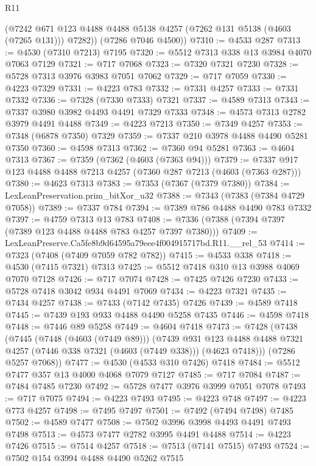 \begin{lexlean}{R11}
\begin{coremodule}
        (@7242 @671 @123 @4488 @4488 @5138 @4257 (@7262 @131 @5138 (@4603 (@7265 @131))) @7282))
      (@7286 @7046 @4500))
@7310 := @4533 @287
@7313 := @4530 (@7310 @7213) @7195
@7320 := @5512 @7313 @338 @13 @3984 @4070 @7063 @7129
@7321 := @717 @7068
@7323 := @7320 @7321 @7230
@7328 := @5728 @7313 @3976 @3983 @7051 @7062
@7329 := @717 @7059
@7330 := @4223 @7329
@7331 := @4223 @783
@7332 := @7331 @4257
@7333 := @7331 @7332
@7336 := @7328 (@7330 @7333) @7321
@7337 := @4589 @7313
@7343 := @7337 @3980 @3982 @4493 @4491 @7329 @7333
@7348 := @4573 @7313 @2782 @3979 @4491 @4488
@7349 := @4223 @7213
@7350 := @7349 @4257
@7353 := @7348 (@6878 @7350) @7329
@7359 := @7337 @210 @3978 @4488 @4490 @5281 @7350
@7360 := @4598 @7313
@7362 := @7360 @94 @5281
@7363 := @4604 @7313
@7367 := @7359 (@7362 (@4603 (@7363 @94)))
@7379 := @7337 @917 @123 @4488 @4488 @7213 @4257 (@7360 @287 @7213 (@4603 (@7363 @287)))
@7380 := @4623 @7313
@7383 := @7353 (@7367 (@7379 @7380))
@7384 := LexLeanPreservation.prim_bitXor_u32
@7388 := @7343 (@7383 (@7384 @4729 @7058))
@7389 := @7337 @784
@7394 := @7389 @786 @4488 @4490 @783 @7332
@7397 := @4759 @7313 @13 @783
@7408 := @7336 (@7388 (@7394 @7397 (@7389 @123 @4488 @4488 @783 @4257 @7397 @7380)))
@7409 := LexLeanPreserve.Ca5fe8b9d64595a79eee4f004915717bd.R11.__rel_53
@7414 := @7323 (@7408 (@7409 @7059 @782 @782))
@7415 := @4533 @338
@7418 := @4530 (@7415 @7321) @7313
@7425 := @5512 @7418 @310 @13 @3988 @4069 @7070 @7128
@7426 := @717 @7074
@7428 := @7425 @7426 @7230
@7433 := @5728 @7418 @3042 @934 @4491 @7069
@7434 := @4223 @7321
@7435 := @7434 @4257
@7438 := @7433 (@7142 @7435) @7426
@7439 := @4589 @7418
@7445 := @7439 @193 @933 @4488 @4490 @5258 @7435
@7446 := @4598 @7418
@7448 := @7446 @89 @5258
@7449 := @4604 @7418
@7473 := @7428
    (@7438
      (@7445
        (@7448 (@4603 (@7449 @89)))
        (@7439
          @931
          @123
          @4488
          @4488
          @7321
          @4257
          (@7446 @338 @7321 (@4603 (@7449 @338)))
          (@4623 @7418)))
      (@7286 @5257 @7068))
@7477 := @4530 (@4533 @310 @7426) @7418
@7484 := @5512 @7477 @357 @13 @4000 @4068 @7079 @7127
@7485 := @717 @7084
@7487 := @7484 @7485 @7230
@7492 := @5728 @7477 @3976 @3999 @7051 @7078
@7493 := @717 @7075
@7494 := @4223 @7493
@7495 := @4223 @748
@7497 := @4223 @773 @4257
@7498 := @7495 @7497
@7501 := @7492 (@7494 @7498) @7485
@7502 := @4589 @7477
@7508 := @7502 @3996 @3998 @4493 @4491 @7493 @7498
@7513 := @4573 @7477 @2782 @3995 @4491 @4488
@7514 := @4223 @7426
@7515 := @7514 @4257
@7518 := @7513 (@7141 @7515) @7493
@7524 := @7502 @154 @3994 @4488 @4490 @5262 @7515

\end{coremodule}
\end{lexlean}
